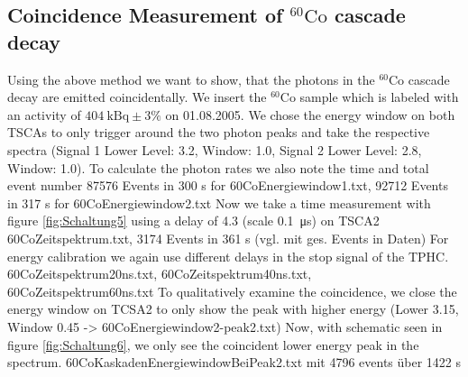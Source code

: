 \subsection{Coincidence Measurement of $^{60}\text{Co}$ cascade decay}
%
Using the above method we want to show, that the photons in the $^{60}\text{Co}$ cascade decay are emitted coincidentally. 
We insert the $^{60}\text{Co}$ sample which is labeled with an activity of $\SI{404}{\kilo\becquerel} \pm 3\%$ on 01.08.2005.
%
We chose the energy window on both TSCAs to only trigger around the two photon peaks and take the respective spectra (Signal 1 Lower Level: 3.2, Window: 1.0, Signal 2 Lower Level: 2.8, Window: 1.0).
To calculate the photon rates we also note the time and total event number
87576 Events in 300 s for 60CoEnergiewindow1.txt, 
92712 Events in 317 s for 60CoEnergiewindow2.txt
%
Now we take a time measurement with figure \ref{fig:Schaltung5} using a delay of 4.3 (scale \SI{0.1}{\micro\second}) on TSCA2
60CoZeitspektrum.txt, 3174 Events in 361 s (vgl. mit ges. Events in Daten)
%
For energy calibration we again use different delays in the stop signal of the TPHC.
60CoZeitspektrum20ns.txt, 
60CoZeitspektrum40ns.txt, 
60CoZeitspektrum60ns.txt
%
To qualitatively examine the coincidence, we close the energy window on TCSA2 to only show the peak with higher energy (Lower 3.15, Window 0.45 -> 60CoEnergiewindow2-peak2.txt)
%
Now, with schematic seen in figure \ref{fig:Schaltung6}, we only see the coincident lower energy peak in the spectrum.
60CoKaskadenEnergiewindowBeiPeak2.txt mit 4796 events über 1422 s
